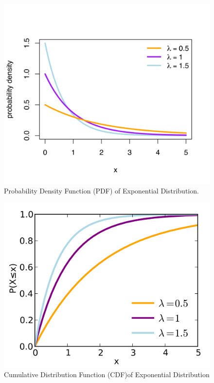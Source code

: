 \begin{figure}[h!]
\begin{center}
	\includegraphics[scale=0.1]{exponential_pdf.png}
	\caption[]{Probability Density Function (PDF) of Exponential Distribution.}
	\label{fairdiepmf}
	\end{center}
	\end{figure}
	
\begin{figure}[h!]
\begin{center}
	\includegraphics[scale=0.07]{exponential_cdf.png}
	\caption[]{Cumulative Distribution Function (CDF)of Exponential Distribution}
	\label{fairdiepmf}
	\end{center}
	\end{figure}










